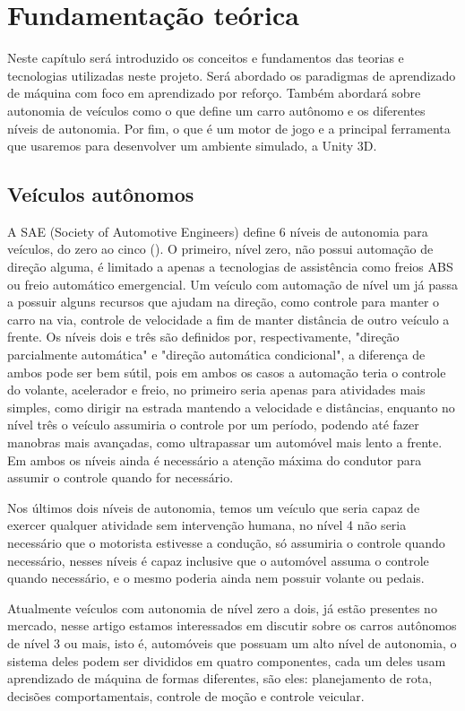 \chapter{Fundamentação teórica}
Neste capítulo será introduzido os conceitos e fundamentos das teorias e tecnologias utilizadas neste projeto. Será abordado os paradigmas de aprendizado de máquina com foco em aprendizado por reforço. Também abordará sobre autonomia de veículos como o que define um carro autônomo e os diferentes níveis de autonomia. Por fim, o que é um motor de jogo e a principal ferramenta que usaremos para desenvolver um ambiente simulado, a Unity 3D.

\section{Veículos autônomos}
A SAE (Society of Automotive Engineers) define 6 níveis de autonomia para veículos, do zero ao cinco (). O primeiro, nível zero, não possui automação de direção alguma, é limitado a apenas a tecnologias de assistência como freios ABS ou freio automático emergencial. Um veículo com automação de nível um já passa a possuir alguns recursos que ajudam na direção, como controle para manter o carro na via, controle de velocidade a fim de manter distância de outro veículo a frente. Os níveis dois e três são definidos por, respectivamente, "direção parcialmente automática" e "direção automática condicional", a diferença de ambos pode ser bem sútil, pois em ambos os casos a automação teria o controle do volante, acelerador e freio, no primeiro seria apenas para atividades mais simples, como dirigir na estrada mantendo a velocidade e distâncias, enquanto no nível três o veículo assumiria o controle por um período, podendo até fazer manobras mais avançadas, como ultrapassar um automóvel mais lento a frente. Em ambos os níveis ainda é necessário a atenção máxima do condutor para assumir o controle quando for necessário.

Nos últimos dois níveis de autonomia, temos um veículo que seria capaz de exercer qualquer atividade sem intervenção humana, no nível 4 não seria necessário que o motorista estivesse a condução, só assumiria o controle quando necessário, nesses níveis é capaz inclusive que o automóvel assuma o controle quando necessário, e o mesmo poderia ainda nem possuir volante ou pedais.

Atualmente veículos com autonomia de nível zero a dois, já estão presentes no mercado, nesse artigo estamos interessados em discutir sobre os carros autônomos de nível 3 ou mais, isto é, automóveis que possuam um alto nível de autonomia, o sistema deles podem ser divididos em quatro componentes, cada um deles usam aprendizado de máquina de formas diferentes, são eles: planejamento de rota, decisões comportamentais, controle de moção e controle veicular. 

